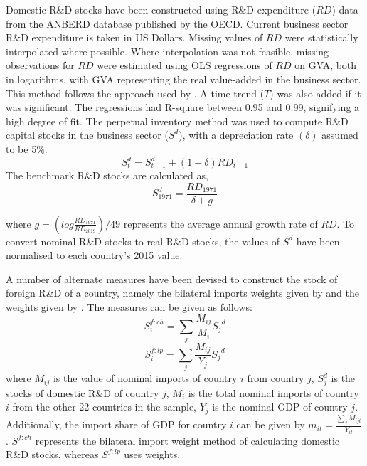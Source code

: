 \documentclass[12pt]{article}
\begin{document}
Domestic R\&D stocks have been constructed using R\&D expenditure ($RD$) data from the ANBERD database published by the OECD. Current business sector R\&D expenditure is taken in US Dollars. Missing values of $RD$ were statistically interpolated where possible. Where interpolation was not feasible, missing observations for $RD$ were estimated using OLS regressions of $RD$ on GVA, both in logarithms, with GVA representing the real value-added in the business sector. This method follows the approach used by \citet{Coe2009}. A time trend ($T$) was also added if it was significant. The regressions had R-square between 0.95 and 0.99, signifying a high degree of fit. The perpetual inventory method was used to compute R\&D capital stocks in the business sector ($S^d$), with a depreciation rate $(\delta)$ assumed to be 5\%.
\begin{equation}
S_t^{d} = S_{t-1}^{d} + (1-\delta)RD_{t-1}
\end{equation}
The benchmark R\&D stocks are calculated as,
\begin{equation}
S_{1971}^{d}= \frac{RD_{1971}}{\delta+g}
\end{equation}

where $g=(log\frac{RD_{1971}}{RD_{2019}})/{49}$ represents the average annual growth rate of $RD$. To convert nominal R\&D stocks to real R\&D stocks, the values of $S^d$ have been normalised to each country's 2015 value. 

A number of alternate measures have been devised to construct the stock of foreign R\&D of a country, namely the bilateral imports weights given by \citet{Coe1995} and the weights given by \citet{Lichtenberg1998}. The measures can be given as follows:
\begin{equation}
S_i^{f:ch}=\sum_j{\frac{M_{ij}}{M_i}  {S_j}^d}
\label{eq: ch}
\end{equation}
\begin{equation}
S_i^{f:lp}=\sum_j{\frac{M_{ij}}{Y_j}  {S_j}^d}
\label{eq: lp}
\end{equation}
where $M_{ij}$ is the value of nominal imports of country $i$ from country $j$, $S_j^d$ is the stocks of domestic R\&D of country $j$, $M_i$ is the total nominal imports of country $i$ from the other 22 countries in the sample, $Y_j$ is the nominal GDP of country $j$. Additionally, the import share of GDP for country $i$ can be given by $m_{it}=\frac{\sum_j{M_{ijt}}}{Y_{it}}$. $S^{f:ch}$ represents the bilateral import weight method of calculating domestic R\&D stocks, whereas $S^{f:lp}$ uses \citet{Lichtenberg1998} weights. 
\end{document}
